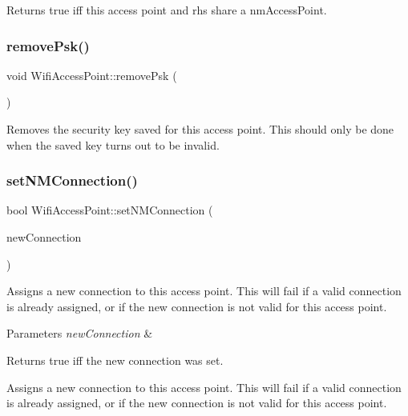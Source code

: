 Returns true iff this access point and rhs share a nm\+Access\+Point. \mbox{\label{classWifiAccessPoint_aada4d71afdd43cef918be6b84abc8784}} 
\subsubsection{\texorpdfstring{remove\+Psk()}{removePsk()}}
{\footnotesize\ttfamily void Wifi\+Access\+Point\+::remove\+Psk (\begin{DoxyParamCaption}{ }\end{DoxyParamCaption})}

Removes the security key saved for this access point. This should only be done when the saved key turns out to be invalid. \mbox{\label{classWifiAccessPoint_aaeead3366da810084fb1bb491aec1627}} 
\subsubsection{\texorpdfstring{set\+N\+M\+Connection()}{setNMConnection()}}
{\footnotesize\ttfamily bool Wifi\+Access\+Point\+::set\+N\+M\+Connection (\begin{DoxyParamCaption}\item[{N\+M\+Connection $\ast$}]{new\+Connection }\end{DoxyParamCaption})}

Assigns a new connection to this access point. This will fail if a valid connection is already assigned, or if the new connection is not valid for this access point.


\begin{DoxyParams}{Parameters}
{\em new\+Connection} & \\
\hline
\end{DoxyParams}
\begin{DoxyReturn}{Returns}
true iff the new connection was set.
\end{DoxyReturn}
Assigns a new connection to this access point. This will fail if a valid connection is already assigned, or if the new connection is not valid for this access point. \mbox{\label{classWifiAccessPoint_a6e1364c9bd6d91015e8b5b69ef09e9e3}} 
